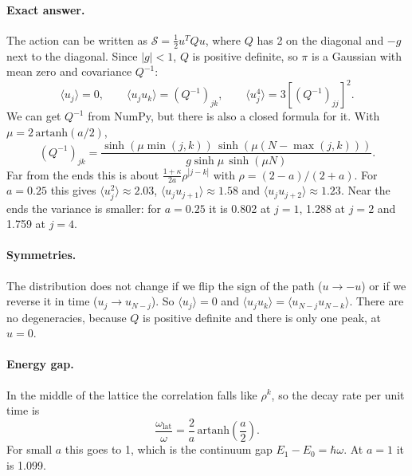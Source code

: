 \documentclass[11pt]{article}
\begin{document}
\paragraph{Exact answer.} The action can be written as $\mathcal S = \frac12 u^T Q u$, where $Q$ has 2 on the diagonal and $-g$ next to the diagonal. Since $|g| < 1$, $Q$ is positive definite, so $\pi$ is a Gaussian with mean zero and covariance $Q^{-1}$:
\begin{equation}
  \langle u_j \rangle = 0, \qquad \langle u_j u_k \rangle = (Q^{-1})_{jk}, \qquad \langle u_j^4 \rangle = 3 \left[(Q^{-1})_{jj}\right]^2 .
  \label{eq:exact}
\end{equation}
We can get $Q^{-1}$ from NumPy, but there is also a closed formula for it. With $\mu = 2\,\mathrm{artanh}(a/2)$,
\begin{equation}
  (Q^{-1})_{jk} = \frac{\sinh(\mu \min(j,k))\, \sinh(\mu(N-\max(j,k)))}{g \sinh\mu \, \sinh(\mu N)} .
  \label{eq:Qinv}
\end{equation}
Far from the ends this is about $\frac{1+\kappa}{2a}\rho^{|j-k|}$ with $\rho = (2-a)/(2+a)$. For $a = 0.25$ this gives $\langle u_j^2\rangle \approx 2.03$, $\langle u_j u_{j+1}\rangle \approx 1.58$ and $\langle u_j u_{j+2}\rangle \approx 1.23$. Near the ends the variance is smaller: for $a = 0.25$ it is 0.802 at $j = 1$, 1.288 at $j = 2$ and 1.759 at $j = 4$.

\paragraph{Symmetries.} The distribution does not change if we flip the sign of the path ($u \to -u$) or if we reverse it in time ($u_j \to u_{N-j}$). So $\langle u_j\rangle = 0$ and $\langle u_j u_k\rangle = \langle u_{N-j}u_{N-k}\rangle$. There are no degeneracies, because $Q$ is positive definite and there is only one peak, at $u = 0$.

\paragraph{Energy gap.} In the middle of the lattice the correlation falls like $\rho^k$, so the decay rate per unit time is
\begin{equation}
  \frac{\omega_{\text{lat}}}{\omega} = \frac{2}{a}\,\mathrm{artanh}\!\left(\frac a2\right).
  \label{eq:wlat}
\end{equation}
For small $a$ this goes to 1, which is the continuum gap $E_1 - E_0 = \hbar\omega$. At $a = 1$ it is 1.099.
\end{document}
